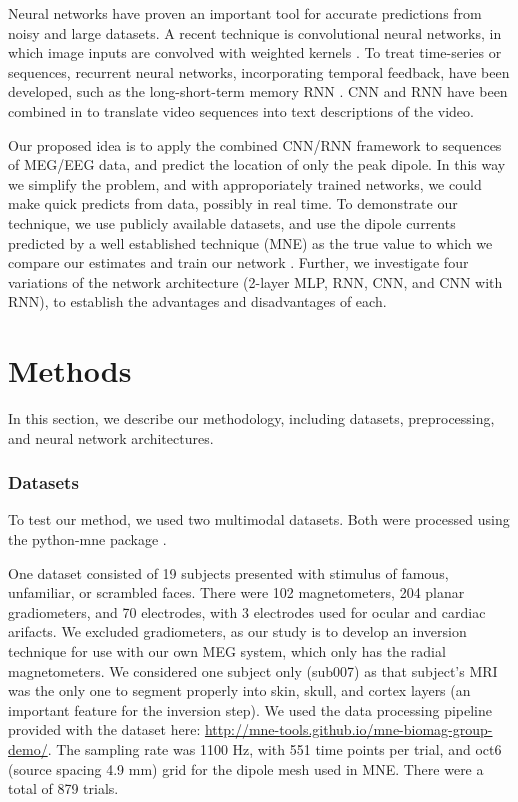\documentclass[journal]{IEEEtran}
\begin{document}
Neural networks have proven an important tool for accurate predictions from noisy and large datasets. A recent technique is convolutional neural networks, in which image inputs are convolved with weighted kernels \cite{lecun1998gradient}. To treat time-series or sequences, recurrent neural networks, incorporating temporal feedback, have been developed, such as the long-short-term memory RNN \cite{hochreiter1997long}. CNN and RNN have been combined in \cite{venugopalan2014translating} to translate video sequences into text descriptions of the video.


Our proposed idea is to apply the combined CNN/RNN framework to sequences of MEG/EEG data, and predict the location of only the peak dipole. In this way we simplify the problem, and with approporiately trained networks, we could make quick predicts from data, possibly in real time. To demonstrate our technique, we use publicly available datasets, and use the dipole currents predicted by a well established technique (MNE) as the true value to which we compare our estimates and train our network \cite{gramfort2014mne}. Further, we investigate four variations of the network architecture (2-layer MLP, RNN, CNN, and CNN with RNN), to establish the advantages and disadvantages of each.

\section{Methods}

In this section, we describe our methodology, including datasets, preprocessing, and neural network architectures.

\subsubsection{Datasets}

To test our method, we used two multimodal datasets. Both were processed using the python-mne package \cite{gramfort2014mne}.

One dataset \cite{wakeman2015multi} consisted of 19 subjects presented with stimulus of famous, unfamiliar, or scrambled faces. There were 102 magnetometers, 204 planar gradiometers, and 70 electrodes, with 3 electrodes used for ocular and cardiac arifacts. We excluded gradiometers, as our study is to develop an inversion technique for use with our own MEG system, which only has the radial magnetometers. We considered one subject only (sub007) as that subject's MRI was the only one to segment properly into skin, skull, and cortex layers (an important feature for the inversion step). We used the data processing pipeline provided with the dataset here: \url{http://mne-tools.github.io/mne-biomag-group-demo/}. The sampling rate was 1100 Hz, with 551 time points per trial, and oct6 (source spacing 4.9 mm) grid for the dipole mesh used in MNE. There were a total of 879 trials.
\end{document}
